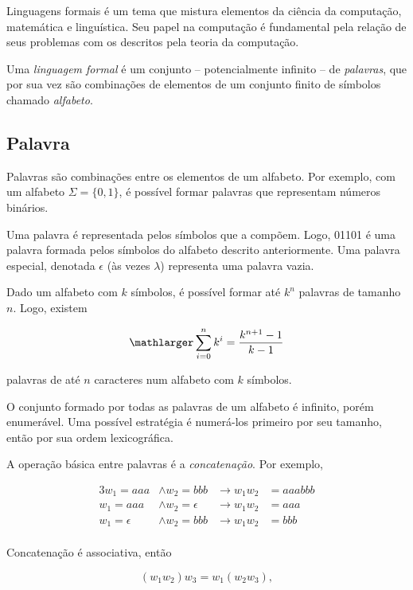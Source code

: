 \documentclass[a4paper,12pt,oneside,onecolumn]{uerj}
\begin{document}
Linguagens formais é um tema que mistura elementos da ciência da computação, matemática e linguística. Seu papel na computação é fundamental pela relação de seus problemas com os descritos pela teoria da computação.

Uma \emph{linguagem formal} é um conjunto -- potencialmente infinito -- de \emph{palavras}, que por sua vez são combinações de elementos de um conjunto finito de símbolos chamado \emph{alfabeto}.

\subsection{Palavra}

Palavras são combinações entre os elementos de um alfabeto. Por exemplo, com um alfabeto $\Sigma = \{0, 1\}$, é possível formar palavras que representam números binários.

Uma palavra é representada pelos símbolos que a compõem. Logo, 01101 é uma palavra formada pelos símbolos do alfabeto descrito anteriormente. Uma palavra especial, denotada $\epsilon$ (às vezes $\lambda$) representa uma palavra vazia.

Dado um alfabeto com $k$ símbolos, é possível formar até $k^n$ palavras de tamanho $n$. Logo, existem

\begin{equation*}
	\mathlarger \sum^{n}_{i=0} k^i = \frac{k^{n+1}-1}{k-1}
\end{equation*}

palavras de até $n$ caracteres num alfabeto com $k$ símbolos.

O conjunto formado por todas as palavras de um alfabeto é infinito, porém enumerável. Uma possível estratégia é numerá-los primeiro por seu tamanho, então por sua ordem lexicográfica.

A operação básica entre palavras é a \emph{concatenação}. Por exemplo, 

\begin{alignat*}{3}
w_1 = aaa &\wedge w_2=bbb  &\rightarrow w_1w_2 &= aaabbb \\
w_1 = aaa &\wedge w_2=\epsilon  &\rightarrow w_1w_2 &= aaa \\
w_1 = \epsilon &\wedge w_2=bbb  &\rightarrow w_1w_2 &= bbb \\
\end{alignat*}

Concatenação é associativa, então 

\begin{equation*}
(w_1w_2)w_3 = w_1(w_2w_3),
\end{equation*}
\end{document}

